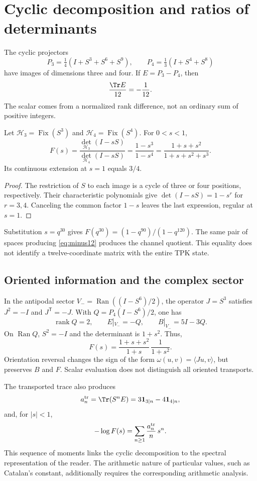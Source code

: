 \section{Cyclic decomposition and ratios of determinants}
The cyclic projectors
\[
P_3=\tfrac14(I+S^3+S^6+S^9),\qquad
P_4=\tfrac13(I+S^4+S^8)
\]
have images of dimensions three and four. If $E=P_3-P_4$, then
\begin{equation}
\frac{\Tr E}{12}=-\frac1{12}.
\label{eq:minus12}
\end{equation}
The scalar comes from a normalized rank difference, not an
ordinary sum of positive integers.

\begin{theorem}
Let $\mathcal H_3=\operatorname{Fix}(S^3)$ and
$\mathcal H_4=\operatorname{Fix}(S^4)$. For $0<s<1$,
\begin{equation}
F(s)=\frac{\det_{\mathcal H_3}(I-sS)}{\det_{\mathcal H_4}(I-sS)}
=\frac{1-s^3}{1-s^4}
=\frac{1+s+s^2}{1+s+s^2+s^3}.
\label{eq:det}
\end{equation}
Its continuous extension at $s=1$ equals $3/4$.
\end{theorem}
\begin{proof}
The restriction of $S$ to each image is a cycle of three or four
positions, respectively. Their characteristic polynomials give
$\det(I-sS)=1-s^r$ for $r=3,4$. Canceling the common factor $1-s$
leaves the last expression, regular at $s=1$.
\end{proof}

Substitution $s=q^{30}$ gives
$F(q^{30})=(1-q^{90})/(1-q^{120})$.
The same pair of spaces producing \eqref{eq:minus12}
produces the channel quotient. This equality does not identify
a twelve-coordinate matrix with the entire TPK state.

\subsection{Oriented information and the complex sector}
In the antipodal sector $V_-=\operatorname{Ran}((I-S^6)/2)$,
the operator $J=S^3$ satisfies $J^2=-I$ and $J^{\mathsf T}=-J$.
With $Q=P_4(I-S^6)/2$, one has
\[
\operatorname{rank}Q=2,\qquad E|_{V_-}=-Q,\qquad B|_{V_-}=5I-3Q.
\]
On $\operatorname{Ran}Q$, $S^2=-I$ and the determinant is $1+s^2$.
Thus,
\[
F(s)=\frac{1+s+s^2}{1+s}\,\frac1{1+s^2}.
\]
Orientation reversal changes the sign of the form
$\omega(u,v)=\langle Ju,v\rangle$, but preserves $B$ and $F$.
Scalar evaluation does not distinguish all oriented transports.

The transported trace also produces
\[
a_n^{\rm tr}=\Tr(S^nE)=3\mathbf1_{3\mid n}-4\mathbf1_{4\mid n},
\]
and, for $|s|<1$,
\[
-\log F(s)=\sum_{n\ge1}\frac{a_n^{\rm tr}}n\,s^n.
\]
This sequence of moments links the cyclic decomposition to the
spectral representation of the reader. The arithmetic nature of particular
values, such as Catalan's constant, additionally requires the corresponding
arithmetic analysis.
